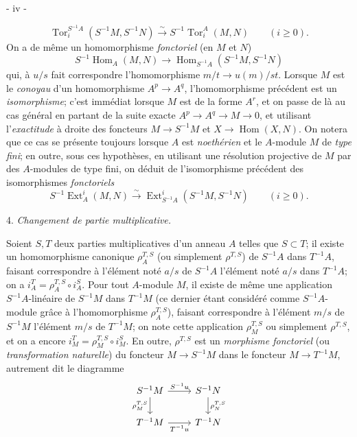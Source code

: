 \begin{center}
- iv -
\end{center}

$$ \operatorname{Tor}_i^{S^{-1}A}(S^{-1}M, S^{-1}N) \xrightarrow{\sim} S^{-1}\operatorname{Tor}_i^A(M, N) \qquad (i \geq 0) . $$
On a de même un homomorphisme \emph{fonctoriel} (en $M$ et $N$)
$$ S^{-1}\operatorname{Hom}_A(M, N) \to \operatorname{Hom}_{S^{-1}A}(S^{-1}M, S^{-1}N) $$
qui, à $u/s$ fait correspondre l'homomorphisme $m/t \to u(m)/st$. Lorsque $M$ est le \emph{conoyau} d'un homomorphisme $A^p \to A^q$, l'homomorphisme précédent est un \emph{isomorphisme}; c'est immédiat lorsque $M$ est de la forme $A^r$, et on passe de là au cas général en partant de la suite exacte $A^p \to A^q \to M \to 0$, et utilisant l'\emph{exactitude} à droite des foncteurs $M \to S^{-1}M$ et $X \to \operatorname{Hom}(X, N)$. On notera que ce cas se présente toujours lorsque $A$ est \emph{noethérien} et le $A$-module $M$ de \emph{type fini}; en outre, sous ces hypothèses, en utilisant une résolution projective de $M$ par des $A$-modules de type fini, on déduit de l'isomorphisme précédent des isomorphismes \emph{fonctoriels}
$$ S^{-1}\operatorname{Ext}_A^i(M, N) \xrightarrow{\sim} \operatorname{Ext}_{S^{-1}A}^i(S^{-1}M, S^{-1}N) \qquad (i \geq 0) . $$

4. \emph{Changement de partie multiplicative.}

Soient $S, T$ deux parties multiplicatives d'un anneau $A$ telles que $S \subset T$; il existe un homomorphisme canonique $\rho_A^{T,S}$ (ou simplement $\rho^{T,S}$) de $S^{-1}A$ dans $T^{-1}A$, faisant correspondre à l'élément noté $a/s$ de $S^{-1}A$ l'élément noté $a/s$ dans $T^{-1}A$; on a $i_A^T = \rho_A^{T,S} \circ i_A^S$. Pour tout $A$-module $M$, il existe de même une application $S^{-1}A$-linéaire de $S^{-1}M$ dans $T^{-1}M$ (ce dernier étant considéré comme $S^{-1}A$-module grâce à l'homomorphisme $\rho_A^{T,S}$), faisant correspondre à l'élément $m/s$ de $S^{-1}M$ l'élément $m/s$ de $T^{-1}M$; on note cette application $\rho_M^{T,S}$ ou simplement $\rho^{T,S}$, et on a encore $i_M^T = \rho_M^{T,S} \circ i_M^S$. En outre, $\rho^{T,S}$ est un \emph{morphisme fonctoriel} (ou \emph{transformation naturelle}) du foncteur $M \to S^{-1}M$ dans le foncteur $M \to T^{-1}M$, autrement dit le diagramme
$$
\begin{tikzcd}
S^{-1}M \arrow[r, "S^{-1}u"] \arrow[d, "\rho_M^{T,S}"'] & S^{-1}N \arrow[d, "\rho_N^{T,S}"] \\
T^{-1}M \arrow[r, "T^{-1}u"'] & T^{-1}N
\end{tikzcd}
$$

